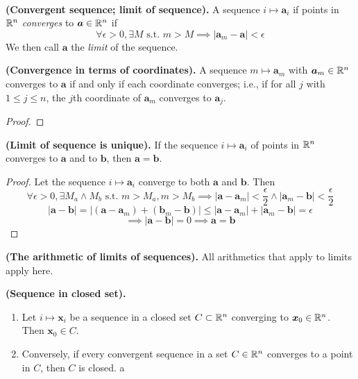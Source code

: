 \\

\begin{defn}
\textbf{(Convergent sequence; limit of sequence).} A sequence $i \mapsto \bm{a}_i$ if points in $\mathbb{R}^n$ \textit{converges} to $\bm{a}\in \mathbb{R}^n$ if
\[\forall \epsilon > 0, \exists M \text{ s.t. } m > M \implies |\bm{a}_m-\bm{a}| < \epsilon\]
We then call $\bm{a}$ the \textit{limit} of the sequence.
\end{defn}

\begin{proposition}
  \textbf{(Convergence in terms of coordinates).} A sequence $m\mapsto \bm{a}_m$ with $\bm{a}_m\in\mathbb{R}^n$ converges to $\bm{a}$ if and only if each coordinate converges; i.e., if for all $j$ with $1\leq j\leq n$, the $j$th coordinate of $\bm{a}_m$ converges to $\bm{a}_j$.
\end{proposition}

\begin{proof}

\end{proof}

\begin{proposition}
\textbf{(Limit of sequence is unique). } If the sequence $i\mapsto \bm{a}_i$ of points in $\mathbb{R}^n$ converges to $\bm{a}$ and to $\bm{b}$, then $\bm{a}=\bm{b}$.
\end{proposition}

\begin{proof}
Let the sequence $i\mapsto \bm{a}_i$ converge to both $\bm{a}$ and $\bm{b}$. Then \[\forall \epsilon > 0, \exists M_a \land M_b \text{ s.t. } m > M_a, m > M_b \implies |\bm{a}-\bm{a}_{m}| < \frac{\epsilon}{2} \land |\bm{a}_{m} - \bm{b}| < \frac{\epsilon}{2}\]
\[|\bm{a}-\bm{b}|=|(\bm{a}-\bm{a}_m)+(\bm{b}_m-\bm{b})| \leq |\bm{a}-\bm{a}_{m}|+ |\bm{a}_{m} - \bm{b}| = \epsilon\]
\[\implies |\bm{a}-\bm{b}| = 0 \implies \bm{a}=\bm{b}\]
\end{proof}

\begin{theorem}
\textbf{(The arithmetic of limits of sequences). } All arithmetics that apply to limits apply here.
\end{theorem}

\begin{proposition}
\textbf{(Sequence in closed set).}
\begin{enumerate}
  \item Let $i\mapsto \bm{x}_i$ be a sequence in a closed set $C \subset \mathbb{R}^n$ converging to $\bm{x}_0\in \mathbb{R}^n$. Then $\bm{x}_0\in C$.
  \item Conversely, if every convergent sequence in a set $C \in \mathbb{R}^n$ converges to a point in $C$, then $C$ is closed. a
\end{enumerate}
\end{proposition}
